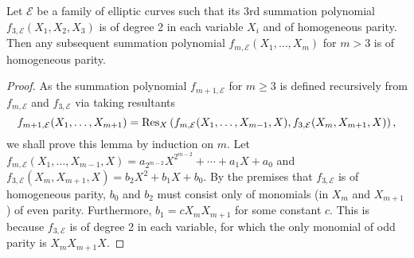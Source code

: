 %
\begin{lemma}
  \label{th:summation-polynomial}
  Let $\mathcal E$ be a family of elliptic curves such that its 3rd
  summation polynomial $f_{3,\mathcal E}(X_1,X_2,X_3)$ is of degree 2
  in each variable $X_i$ and of homogeneous parity.
  Then any subsequent summation polynomial
  $f_{m,\mathcal E}(X_1,\ldots,X_m)$ for $m>3$ is of homogeneous
  parity.
\end{lemma}
% 
\begin{proof}
  As the summation polynomial $f_{m+1,\mathcal E}$ for
  $m\geq 3$ is defined recursively from $f_{m,\mathcal E}$ and
  $f_{3,\mathcal E}$ via taking resultants
  \[ f_{m+1,\mathcal E}(X_1,\dots,X_{m+1}) = \operatorname{Res}_X\left(f_{m,\mathcal
        E}(X_1,\dots,X_{m-1},X),f_{3,\mathcal
        E}(X_m,X_{m+1},X)\right), \]
  we shall prove this lemma by induction on $m$.
  Let
  $f_{m,\mathcal
    E}(X_1,\ldots,X_{m-1},X)=a_{2^{m-2}}X^{2^{m-2}}+\cdots+a_1X+a_0$
  and $f_{3,\mathcal E}(X_m,X_{m+1},X)=b_2X^2+b_1X+b_0$.
  By the premises that $f_{3,\mathcal E}$ is of homogeneous parity,
  $b_0$ and $b_2$ must consist only of monomials (in $X_m$ and
  $X_{m+1}$) of even parity.
  Furthermore, $b_1=cX_mX_{m+1}$ for some constant $c$.
  This is because $f_{3,\mathcal E}$ is of degree 2 in each variable,
  for which the only monomial of odd parity is $X_mX_{m+1}X$.


\end{proof}
